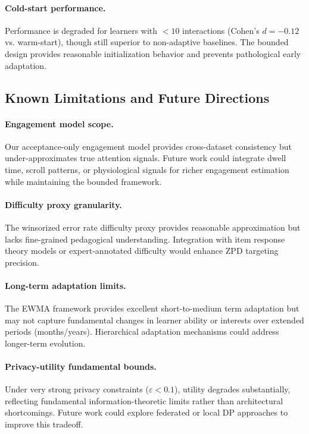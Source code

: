 \paragraph{Cold-start performance.} Performance is degraded for learners with $< 10$ interactions (Cohen's $d = -0.12$ vs. warm-start), though still superior to non-adaptive baselines. The bounded design provides reasonable initialization behavior and prevents pathological early adaptation.

\subsection{Known Limitations and Future Directions}
\label{app:limitations-future}

\paragraph{Engagement model scope.} Our acceptance-only engagement model provides cross-dataset consistency but under-approximates true attention signals. Future work could integrate dwell time, scroll patterns, or physiological signals for richer engagement estimation while maintaining the bounded framework.

\paragraph{Difficulty proxy granularity.} The winsorized error rate difficulty proxy provides reasonable approximation but lacks fine-grained pedagogical understanding. Integration with item response theory models or expert-annotated difficulty would enhance ZPD targeting precision.

\paragraph{Long-term adaptation limits.} The EWMA framework provides excellent short-to-medium term adaptation but may not capture fundamental changes in learner ability or interests over extended periods (months/years). Hierarchical adaptation mechanisms could address longer-term evolution.

\paragraph{Privacy-utility fundamental bounds.} Under very strong privacy constraints ($\varepsilon < 0.1$), utility degrades substantially, reflecting fundamental information-theoretic limits rather than architectural shortcomings. Future work could explore federated or local DP approaches to improve this tradeoff.

